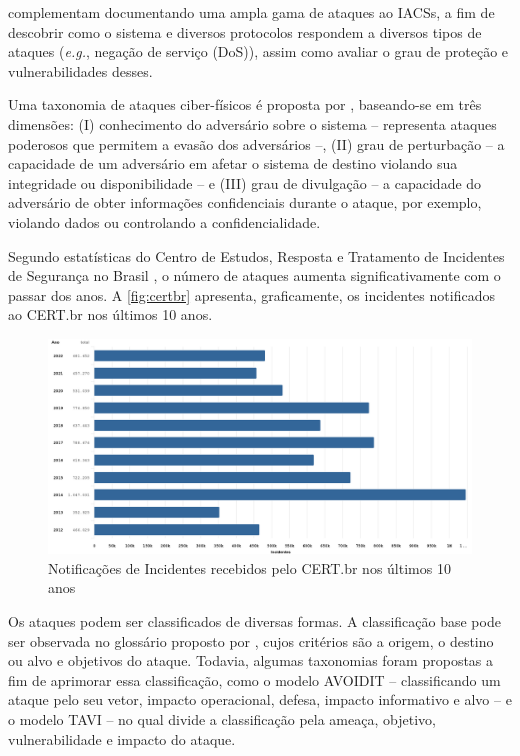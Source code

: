      complementam documentando uma ampla gama de ataques ao IACSs, a fim de descobrir como o sistema e diversos protocolos respondem a diversos tipos de ataques (\textit{e.g.}, negação de serviço (DoS)), assim como avaliar o grau de proteção e vulnerabilidades desses.

    Uma taxonomia de ataques ciber-físicos é proposta por , baseando-se em três dimensões: (I) conhecimento do adversário sobre o sistema -- representa ataques poderosos que permitem a evasão dos adversários --, (II) grau de perturbação -- a capacidade de um adversário em afetar o sistema de destino violando sua integridade ou disponibilidade -- e (III) grau de divulgação -- a capacidade do adversário de obter informações confidenciais durante o ataque, por exemplo, violando dados ou controlando a confidencialidade.

    Segundo estatísticas do Centro de Estudos, Resposta e Tratamento de Incidentes de Segurança no Brasil \cite{cert2023}, o número de ataques aumenta significativamente com o passar dos anos. A \autoref{fig:certbr} apresenta, graficamente, os incidentes notificados ao CERT.br nos últimos 10 anos.

    \begin{figure}[htbp]
        \caption{\label{fig:certbr} Notificações de Incidentes recebidos pelo CERT.br nos últimos 10 anos}
        \begin{center}
            \includegraphics[width=1\textwidth]{USPSC-img/certbr.png}
        \end{center}
    \end{figure}

    Os ataques podem ser classificados de diversas formas. A classificação base pode ser observada no glossário proposto por , cujos critérios são a origem, o destino ou alvo e objetivos do ataque. Todavia, algumas taxonomias foram propostas a fim de aprimorar essa classificação, como o modelo AVOIDIT \cite{simmons2009} -- classificando um ataque pelo seu vetor, impacto operacional, defesa, impacto informativo e alvo -- e o modelo TAVI \cite{drias2015} -- no qual divide a classificação pela ameaça, objetivo, vulnerabilidade e impacto do ataque.

